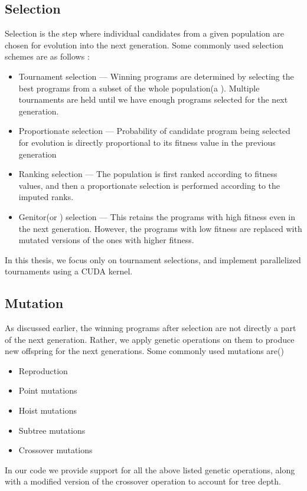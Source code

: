 \subsection{Selection}
\label{subsec:selection}
Selection is the step where individual candidates from a given population are chosen for evolution into the next generation. Some commonly used selection schemes are as follows \cite{GOLDBERG199169}:
\begin{itemize}
  \item Tournament selection --- Winning programs are determined by selecting the best programs from a subset of the whole population(a ). Multiple tournaments are held until we have enough programs selected for the next generation. 
  \item Proportionate selection --- Probability of candidate program being selected for evolution is directly proportional to its fitness value in the previous generation
  \item Ranking selection --- The population is first ranked according to fitness values, and then a proportionate selection is performed according to the imputed ranks. 
  \item Genitor(or ) selection --- This retains the programs with high fitness even in the next generation. However, the programs with low fitness are replaced with mutated versions of the ones with higher fitness.
\end{itemize}

In this thesis, we focus only on tournament selections, and implement parallelized tournaments using a CUDA kernel. 
\subsection{Mutation}
\label{subsec:mutation}
As discussed earlier, the winning programs after selection are not directly a part of the next generation. Rather, we apply genetic operations on them to produce new offspring for the next generations. Some commonly used mutations are(\citep{gplearn})
\begin{itemize}
  \item Reproduction
  \item Point mutations
  \item Hoist mutations
  \item Subtree mutations
  \item Crossover mutations
\end{itemize}
In our code we provide support for all the above listed genetic operations, along with a modified version of the crossover operation to account for tree depth.

